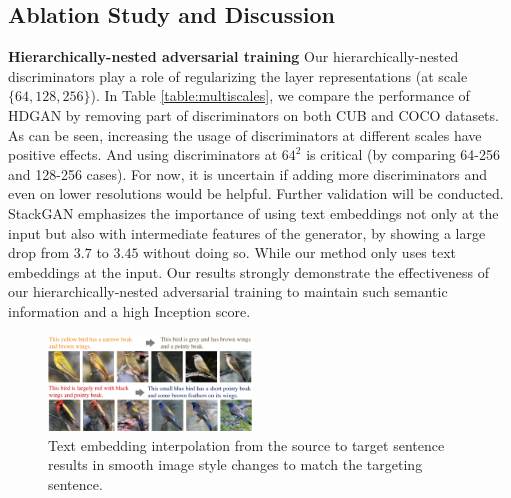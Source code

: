 \documentclass[10pt,twocolumn,letterpaper]{article}
\begin{document}
\subsection{Ablation Study and Discussion}
\textbf{Hierarchically-nested adversarial training} Our hierarchically-nested discriminators play a role of regularizing the layer representations (at scale $\{64, 128, 256\}$). 
In Table \ref{table:multiscales}, we compare the performance of HDGAN by removing part of discriminators on both CUB and COCO datasets. 
As can be seen, increasing the usage of discriminators at different scales have positive effects. And using discriminators at $64^2$ is critical (by comparing 64-256 and 128-256 cases). For now, it is uncertain if adding more discriminators and even on lower resolutions would be helpful. Further validation will be conducted.
StackGAN emphasizes the importance of using text embeddings not only at the input but also with intermediate features of the generator, by showing a large drop from $3.7$ to $3.45$ without doing so. While our method only uses text embeddings at the input. Our results strongly demonstrate the effectiveness of our hierarchically-nested adversarial training to maintain such semantic information and a high Inception score. 

\begin{figure}[t]
	\centering
	\includegraphics[width=0.48\textwidth]{figure/interp.pdf}
	\vspace{-.6cm}
	\caption{Text embedding interpolation from the source to target sentence results in smooth image style changes to match the targeting sentence. } \label{fig:interp}
	\vspace{-.3cm}
\end{figure}
\end{document}
